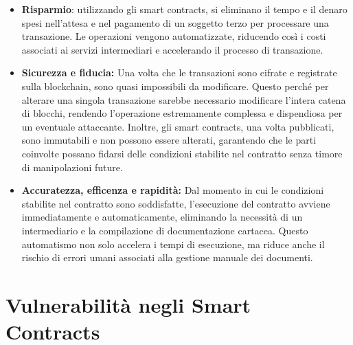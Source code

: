 \documentclass[../../Thesis.tex]{subfiles}
\begin{document}
\begin{itemize}
    \item \textbf{Risparmio}: utilizzando gli smart contracts, si eliminano il tempo e il denaro spesi nell'attesa e nel pagamento di un soggetto terzo per processare una transazione. Le operazioni vengono automatizzate, riducendo così i costi associati ai servizi intermediari e accelerando il processo di transazione.
    \item \textbf{Sicurezza e fiducia:} Una volta che le transazioni sono cifrate e registrate sulla blockchain, sono quasi impossibili da modificare. Questo perché per alterare una singola transazione sarebbe necessario modificare l'intera catena di blocchi, rendendo l'operazione estremamente complessa e dispendiosa per un eventuale attaccante. Inoltre, gli smart contracts, una volta pubblicati, sono immutabili e non possono essere alterati, garantendo che le parti coinvolte possano fidarsi delle condizioni stabilite nel contratto senza timore di manipolazioni future.
    \item \textbf{Accuratezza, efficenza e rapidità:} Dal momento in cui le condizioni stabilite nel contratto sono soddisfatte, l'esecuzione del contratto avviene immediatamente e automaticamente, eliminando la necessità di un intermediario e la compilazione di documentazione cartacea. Questo automatismo non solo accelera i tempi di esecuzione, ma riduce anche il rischio di errori umani associati alla gestione manuale dei documenti.
    
\end{itemize}
\section{Vulnerabilità negli Smart Contracts}
\end{document}
